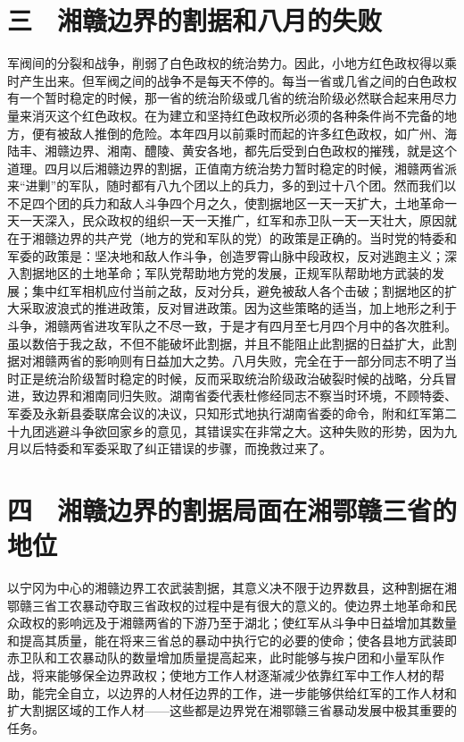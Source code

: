 \section{三　湘赣边界的割据和八月的失败}

军阀间的分裂和战争，削弱了白色政权的统治势力。因此，小地方红色政权得以乘时产生出来。但军阀之间的战争不是每天不停的。每当一省或几省之间的白色政权有一个暂时稳定的时候，那一省的统治阶级或几省的统治阶级必然联合起来用尽力量来消灭这个红色政权。在为建立和坚持红色政权所必须的各种条件尚不完备的地方，便有被敌人推倒的危险。本年四月以前乘时而起的许多红色政权，如广州、海陆丰、湘赣边界、湘南、醴陵、黄安各地，都先后受到白色政权的摧残，就是这个道理。四月以后湘赣边界的割据，正值南方统治势力暂时稳定的时候，湘赣两省派来“进剿”的军队，随时都有八九个团以上的兵力，多的到过十八个团。然而我们以不足四个团的兵力和敌人斗争四个月之久，使割据地区一天一天扩大，土地革命一天一天深入，民众政权的组织一天一天推广，红军和赤卫队一天一天壮大，原因就在于湘赣边界的共产党（地方的党和军队的党）的政策是正确的。当时党的特委和军委的政策是：坚决地和敌人作斗争，创造罗霄山脉中段政权，反对逃跑主义；深入割据地区的土地革命；军队党帮助地方党的发展，正规军队帮助地方武装的发展；集中红军相机应付当前之敌，反对分兵，避免被敌人各个击破；割据地区的扩大采取波浪式的推进政策，反对冒进政策。因为这些策略的适当，加上地形之利于斗争，湘赣两省进攻军队之不尽一致，于是才有四月至七月四个月中的各次胜利。虽以数倍于我之敌，不但不能破坏此割据，并且不能阻止此割据的日益扩大，此割据对湘赣两省的影响则有日益加大之势。八月失败，完全在于一部分同志不明了当时正是统治阶级暂时稳定的时候，反而采取统治阶级政治破裂时候的战略，分兵冒进，致边界和湘南同归失败。湖南省委代表杜修经同志不察当时环境，不顾特委、军委及永新县委联席会议的决议，只知形式地执行湖南省委的命令，附和红军第二十九团逃避斗争欲回家乡的意见，其错误实在非常之大。这种失败的形势，因为九月以后特委和军委采取了纠正错误的步骤，而挽救过来了。

\section{四　湘赣边界的割据局面在湘鄂赣三省的地位}

以宁冈为中心的湘赣边界工农武装割据，其意义决不限于边界数县，这种割据在湘鄂赣三省工农暴动夺取三省政权的过程中是有很大的意义的。使边界土地革命和民众政权的影响远及于湘赣两省的下游乃至于湖北；使红军从斗争中日益增加其数量和提高其质量，能在将来三省总的暴动中执行它的必要的使命；使各县地方武装即赤卫队和工农暴动队的数量增加质量提高起来，此时能够与挨户团和小量军队作战，将来能够保全边界政权；使地方工作人材逐渐减少依靠红军中工作人材的帮助，能完全自立，以边界的人材任边界的工作，进一步能够供给红军的工作人材和扩大割据区域的工作人材——这些都是边界党在湘鄂赣三省暴动发展中极其重要的任务。

